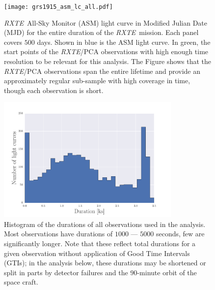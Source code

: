 \documentclass[12pt]{emulateapj}
\newcommand{\project}[1]{\textsl{#1}}
\newcommand{\rxte}{\project{RXTE}}
\begin{document}
\begin{figure}[htbp]
\begin{center}
\texttt{[image: grs1915\_asm\_lc\_all.pdf]}
\caption{\rxte\ All-Sky Monitor (ASM) light curve in Modified Julian Date (MJD) for the entire duration of the \rxte\ mission. Each panel covers $500$ days. Shown in blue is the ASM light curve. In green, the start points of the \rxte/PCA observations with high enough time resolution to be relevant for this analysis. The Figure shows that the \rxte/PCA observations span the entire lifetime and provide an approximately regular sub-sample with high coverage in time, though each observation is short.}
\label{fig:asm_total}
\end{center}
\end{figure}

\begin{figure}[htbp]
\begin{center}
\includegraphics[width=9cm]{grs1915_durations.pdf}
\caption{Histogram of the durations of all observations used in the analysis. Most observations have durations of $1000$ --- $5000$ seconds, few are significantly longer. Note that these reflect total durations for a given observation without application of Good Time Intervals (GTIs); in the analysis below, these durations may be shortened or split in parts by detector failures and the $90$-minute orbit of the space craft.}
\label{fig:obsdurations}
\end{center}
\end{figure}
\end{document}
